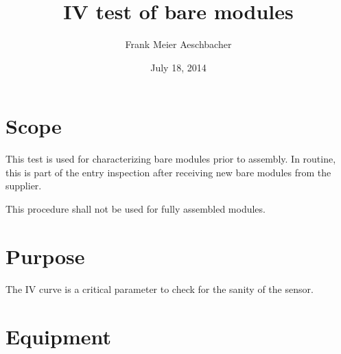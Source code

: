 \documentclass[10pt]{unlsilabsop}
\title{IV test of bare modules}
\date{July 18, 2014}
\author{Frank Meier Aeschbacher}
\begin{document}
\maketitle

\section{Scope}
This test is used for characterizing bare modules prior to assembly. In routine, this is part of the entry inspection after receiving new bare modules from the supplier.

This procedure shall not be used for fully assembled modules.

\section{Purpose}
The IV curve is a critical parameter to check for the sanity of the sensor.



\section{Equipment}
\end{document}
